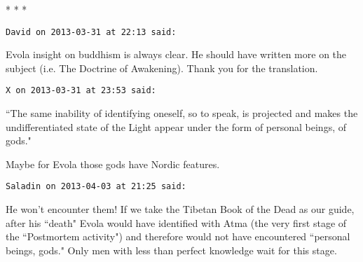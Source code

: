 \begin{center}* * *\end{center}

\begin{footnotesize}\begin{sffamily}

\texttt{David on 2013-03-31 at 22:13 said: }

Evola insight on buddhism is always clear. He should have written more on the subject (i.e. The Doctrine of Awakening). Thank you for the translation.


\hfill

\texttt{X on 2013-03-31 at 23:53 said: }

``The same inability of identifying oneself, so to speak, is projected and makes the undifferentiated state of the Light appear under the form of personal beings, of gods."

Maybe for Evola those gods have Nordic features.


\hfill

\texttt{Saladin on 2013-04-03 at 21:25 said: }

He won't encounter them! If we take the Tibetan Book of the Dead as our guide, after his ``death" Evola would have identified with Atma (the very first stage of the ``Postmortem activity") and therefore would not have encountered ``personal beings, gods." Only men with less than perfect knowledge wait for this stage.


\end{sffamily}\end{footnotesize}
